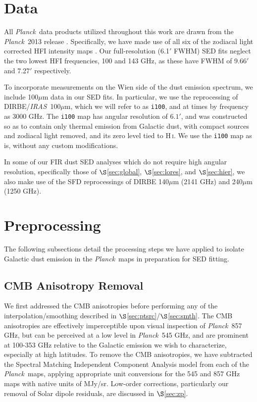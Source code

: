 \documentclass{emulateapj}
\newcommand{\IRAS}{{\it IRAS}}
\newcommand{\PLANCK}{{\it Planck}}
\begin{document}
\section{Data}
\label{sec:data}
All \PLANCK~data products utilized throughout this work are drawn from the 
\PLANCK~2013 release \citep{planck2013}. Specifically, we have made use 
of all six of the zodiacal light corrected HFI intensity maps
\citep[\texttt{R1.10\_nominal\_ZodiCorrected},][]{planckzodi}. Our 
full-resolution (6.1$'$ FWHM) SED fits neglect the two lowest HFI frequencies, 
100 and 143 GHz, as these have FWHM of 9.66$'$ and 7.27$'$ respectively.

To incorporate measurements on the Wien side of the dust emission spectrum, 
we include 100$\mu$m data in our SED fits. In particular, we use the 
\citet[henceforth SFD]{SFD} reprocessing of DIRBE/\IRAS~100$\mu$m, which we 
will refer to as \verb|i100|, and at times by frequency as 3000 GHz. The 
\verb|i100| map has angular resolution of $6.1'$, and was constructed so as to 
contain only thermal emission from Galactic dust, with compact sources and 
zodiacal light removed, and its zero level tied to H\,\textsc{i}. We use the 
\verb|i100| map as is, without any custom modifications. 

In some of our FIR dust SED analyses which do not require high angular 
resolution, specifically those of $\S$\ref{sec:global}, $\S$\ref{sec:lores}, 
and $\S$\ref{sec:hier}, we also make use of the SFD reprocessings of DIRBE 
140$\mu$m (2141 GHz) and 240$\mu$m (1250 GHz).

\section{Preprocessing}
\label{sec:prepro}

The following subsections detail the processing steps we have applied to 
isolate Galactic dust emission in the \PLANCK~maps in preparation for SED
fitting.

\subsection{CMB Anisotropy Removal}
\label{sec:cmb}
We first addressed the CMB anisotropies before performing any of the 
interpolation/smoothing described in $\S$\ref{sec:ptsrc}/$\S$\ref{sec:smth}. 
The CMB anisotropies are effectively imperceptible upon visual inspection 
of \PLANCK~857 GHz, but can be perceived at a low level in \PLANCK~545 GHz, and
are prominent at 100-353 GHz relative to the Galactic emission
we wish to characterize, especially at high latitudes. To remove the CMB 
anisotropies, we have subtracted the Spectral Matching Independent Component 
Analysis \citep[SMICA,][]{smica} model from each of the \PLANCK~maps, 
applying appropriate unit conversions for the 545 and 857 GHz maps with native 
units of MJy/sr. Low-order corrections, particularly our removal of  Solar 
dipole residuals, are discussed in $\S$\ref{sec:zp}.
\end{document}
